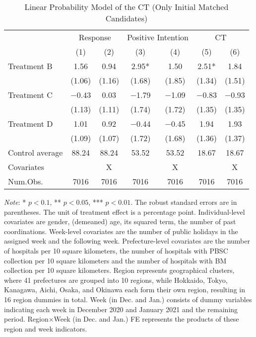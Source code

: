 \documentclass[12pt, a4paper]{article}
\begin{document}
\begin{table}[H]

\caption{\label{tab:lm-reply-test-initial-matched}Linear Probability Model of the CT (Only Initial Matched Candidates)}
\centering
\fontsize{8}{10}\selectfont
\begin{threeparttable}
\begin{tabular}[t]{lcccccc}
\toprule
\multicolumn{1}{c}{ } & \multicolumn{2}{c}{Response} & \multicolumn{2}{c}{Positive Intention} & \multicolumn{2}{c}{CT} \\
\cmidrule(l{3pt}r{3pt}){2-3} \cmidrule(l{3pt}r{3pt}){4-5} \cmidrule(l{3pt}r{3pt}){6-7}
  & (1) & (2) & (3) & (4) & (5) & (6)\\
\midrule
Treatment B & \num{1.56} & \num{0.94} & \num{2.95}* & \num{1.50} & \num{2.51}* & \num{1.84}\\
 & (\num{1.06}) & (\num{1.16}) & (\num{1.68}) & (\num{1.85}) & (\num{1.34}) & (\num{1.51})\\
Treatment C & \num{-0.43} & \num{0.03} & \num{-1.79} & \num{-1.09} & \num{-0.83} & \num{-0.93}\\
 & (\num{1.13}) & (\num{1.11}) & (\num{1.74}) & (\num{1.72}) & (\num{1.35}) & (\num{1.35})\\
Treatment D & \num{1.01} & \num{0.92} & \num{-0.44} & \num{-0.45} & \num{1.94} & \num{1.93}\\
 & (\num{1.09}) & (\num{1.07}) & (\num{1.72}) & (\num{1.68}) & (\num{1.36}) & (\num{1.37})\\
\midrule
Control average & 88.24 & 88.24 & 53.52 & 53.52 & 18.67 & 18.67\\
Covariates &  & X &  & X &  & X\\
Num.Obs. & \num{7016} & \num{7016} & \num{7016} & \num{7016} & \num{7016} & \num{7016}\\
\bottomrule
\end{tabular}
\begin{tablenotes}
\item \emph{Note}: * $p < 0.1$, ** $p < 0.05$, *** $p < 0.01$. The robust standard errors are in parentheses. The unit of treatment effect is a percentage point. Individual-level covariates are gender, (demeaned) age, its squared term, the number of past coordinations. Week-level covariates are the number of public holidays in the assigned week and the following week. Prefecture-level covariates are the number of hospitals per 10 square kilometers, the number of hospitals with PBSC collection per 10 square kilometers and the number of hospitals with BM collection per 10 square kilometers. Region represents geographical clusters, where 41 prefectures are grouped into 10 regions, while Hokkaido, Tokyo, Kanagawa, Aichi, Osaka, and Okinawa each form their own region, resulting in 16 region dummies in total. Week (in Dec. and Jan.) consists of dummy variables indicating each week in December 2020 and January 2021 and the remaining period. Region$\times$Week (in Dec. and Jan.) FE represents the products of these region and week indicators.
\end{tablenotes}
\end{threeparttable}
\end{table}
\end{document}
